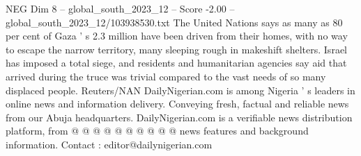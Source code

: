 \begin{textsample}{NEG Dim 8 – global\_south\_2023\_12 – Score -2.00 – global\_south\_2023\_12/103938530.txt}
The United Nations says as many as 80 per cent of Gaza ' s 2.3 million have been driven from their homes, with no way to escape the narrow territory, many sleeping rough in makeshift shelters.
Israel has imposed a total siege, and residents and humanitarian agencies say aid that arrived during the truce was trivial compared to the vast needs of so many displaced people.
Reuters/NAN DailyNigerian.com is among Nigeria ' s leaders in online news and information delivery.
Conveying fresh, factual and reliable news from our Abuja headquarters.
DailyNigerian.com is a verifiable news distribution platform, from @ @ @ @ @ @ @ @ @ @ news features and background information.
Contact : editor@dailynigerian.com

\end{textsample}
